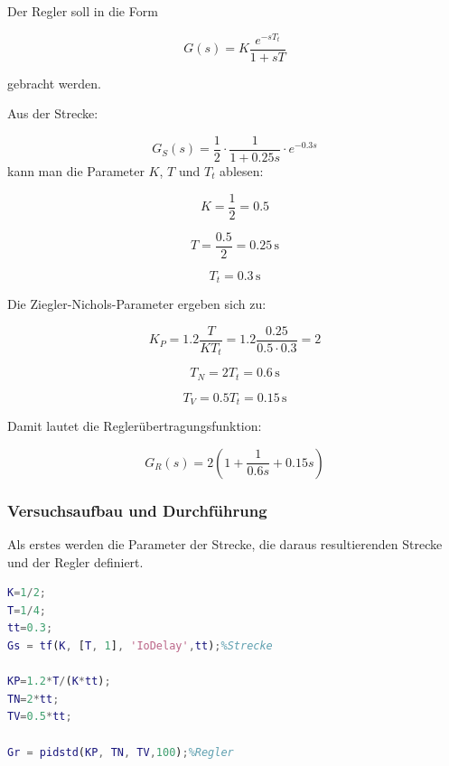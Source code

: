 \documentclass[11pt,a4paper]{article}
\begin{document}
Der Regler soll in die Form

\begin{equation}
G(s)=K\frac{e^{-sT_t}}{1+sT}
\end{equation}

gebracht werden. 


Aus der Strecke:

\begin{equation}
G_S(s)=\frac{1}{2} \cdot \frac{1}{1+0.25s} \cdot e^{-0.3s}
\end{equation}
kann man die Parameter $K$, $T$ und $T_t$ ablesen:

\begin{equation}
K=\frac{1}{2}=0.5
\end{equation}

\begin{equation}
T=\frac{0.5}{2}=0.25\,\mathrm{s}
\end{equation}

\begin{equation}
T_t=0.3\,\mathrm{s}
\end{equation}


Die Ziegler-Nichols-Parameter ergeben sich zu:

\begin{equation}
K_P = 1.2\frac{T}{K T_t} = 1.2\frac{0.25}{0.5 \cdot 0.3} = 2
\end{equation}

\begin{equation}
T_N=2T_t=0.6\,\mathrm{s}
\end{equation}

\begin{equation}
T_V=0.5T_t=0.15\,\mathrm{s}
\end{equation}

Damit lautet die Reglerübertragungsfunktion:

\begin{equation}
G_R(s)= 2 \left( 1+\frac{1}{0.6s} +0.15s \right)
\end{equation}

\subsubsection{Versuchsaufbau und Durchführung}

Als erstes werden die Parameter der Strecke, die daraus resultierenden Strecke und der Regler definiert.

\begin{lstlisting}[language=Matlab, caption={MATLAB-Skript zur Streckendefinition und Stabilitätsanalyse.}]
K=1/2;
T=1/4;
tt=0.3;
Gs = tf(K, [T, 1], 'IoDelay',tt);%Strecke

KP=1.2*T/(K*tt);
TN=2*tt;
TV=0.5*tt;

Gr = pidstd(KP, TN, TV,100);%Regler
\end{lstlisting}
\end{document}
